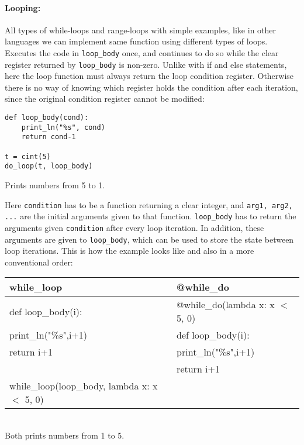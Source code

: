 \paragraph{Looping:}
All types of while-loops and range-loops with simple examples, like in other languages we can implement same function using different types of loops.
Executes the code in \verb|loop_body| once, and continues to do so while the clear register returned by \verb|loop_body| is non-zero. Unlike with if and else statements, here the loop function must always return the loop condition register. Otherwise there is no way of knowing which register holds the condition after each iteration, since the original condition register cannot be modified:
\begin{lstlisting}
def loop_body(cond):
    print_ln("%s", cond)
    return cond-1

t = cint(5)
do_loop(t, loop_body)
\end{lstlisting}
\begin{footnotesize}
  Prints numbers from 5 to 1.
\end{footnotesize}

Here \verb+condition+ has to be a function returning a clear integer, and \verb+arg1, arg2, ...+ are the initial arguments given to that
function. \verb+loop_body+ has to return the arguments given \verb+condition+ after every loop iteration. In addition, these arguments are given to \verb+loop_body+, which can be used to store the state between loop iterations. This is how the example looks like and also in a more conventional order:

\begin{center}
  \begin{tabular}{|l|l|} \hline
    \textbf{while_loop}                         & \textbf{@while_do}               \\ \hline
    def loop_body(i):                           & @while_do(lambda x: x $<$ 5, 0)  \\
    \hspace{5 mm}print_ln("\%s",i+1)            & def loop_body(i):                \\
    \hspace{5 mm}return i+1                     & \hspace{5 mm}print_ln("\%s",i+1) \\
                                                & \hspace{5 mm}return i+1          \\
    while_loop(loop_body, lambda x: x $<$ 5, 0) &                                  \\ \hline
  \end{tabular}
  \begin{footnotesize}
    \\ Both prints numbers from 1 to 5.
  \end{footnotesize}
\end{center}

